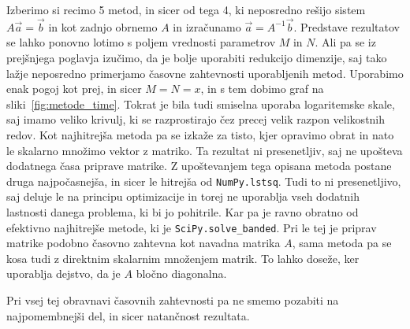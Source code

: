 \documentclass[notoc]{porocilo}
\begin{document}
Izberimo si recimo 5 metod, in sicer od tega 4, ki neposredno rešijo sistem $A\vec{a} = \vec{b}$ in kot zadnjo obrnemo $A$ in izračunamo $\vec{a} = A^{-1} \vec{b}$. Predstave rezultatov se lahko ponovno lotimo s poljem vrednosti parametrov $M$ in $N$. Ali pa se iz prejšnjega poglavja izučimo, da je bolje uporabiti redukcijo dimenzije, saj tako lažje neposredno primerjamo časovne zahtevnosti uporabljenih metod. Uporabimo enak pogoj kot prej, in sicer $M = N = x$, in s tem dobimo graf na sliki~\ref{fig:metode_time}.
Tokrat je bila tudi smiselna uporaba logaritemske skale, saj imamo veliko krivulj, ki se razprostirajo čez precej velik razpon velikostnih redov. Kot najhitrejša metoda pa se izkaže za tisto, kjer opravimo obrat in nato le skalarno množimo vektor z matriko. Ta rezultat ni presenetljiv, saj ne upošteva dodatnega časa priprave matrike. Z upoštevanjem tega opisana metoda postane druga najpočasnejša, in sicer le hitrejša od \texttt{NumPy.lstsq}. Tudi to ni presenetljivo, saj deluje le na principu optimizacije in torej ne uporablja vseh dodatnih lastnosti danega problema, ki bi jo pohitrile. Kar pa je ravno obratno od efektivno najhitrejše metode, ki je \texttt{SciPy.solve\_banded}. Pri le tej je priprav matrike podobno časovno zahtevna kot navadna matrika $A$, sama metoda pa se kosa tudi z direktnim skalarnim množenjem matrik. To lahko doseže, ker uporablja dejstvo, da je $A$ bločno diagonalna.

Pri vsej tej obravnavi časovnih zahtevnosti pa ne smemo pozabiti na najpomembnejši del, in sicer natančnost rezultata.
\end{document}
